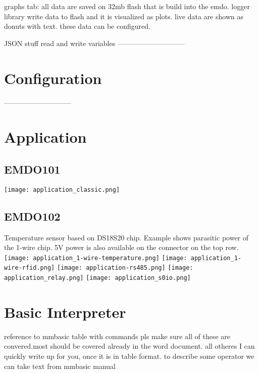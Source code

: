 \documentclass[11pt,fleqn]{book} %
\numberwithin{equation}{section} %
\numberwithin{figure}{section} %
\numberwithin{table}{section} %
\begin{document}
graphs tab: all data are saved on 32mb flash that is build into the emdo. logger library write data to flash and it is visualized as plots. live data are shown as donuts with text. these data can be configured.

JSON stuff read and write variables
-----------------------------
\chapter{Configuration}


-----------------------------

\chapter{Application}

\section*{EMDO101}
\label{EMDO101_Application}
\texttt{[image: application\_classic.png]}\newline
\section*{EMDO102}
\label{EMDO102_DIN_Appplication}


Temperature sensor based on DS18S20 chip. Example shows parasitic power of the 1-wire chip. 5V power is also available on the connector on the top row.
\texttt{[image: application\_1-wire-temperature.png]}\newline
\texttt{[image: application\_1-wire-rfid.png]}\newline
\texttt{[image: application-rs485.png]}\newline
\texttt{[image: application\_relay.png]}\newline
\texttt{[image: application\_s0io.png]}\newline

\chapter{Basic Interpreter}

reference to mmbasic
table with commands
pls make sure all of these are convered.most should be covered already in the word document. all otheres I can quickly write up for you, once it is in table format. to describe some operator we can take text from mmbasic manual
\end{document}
